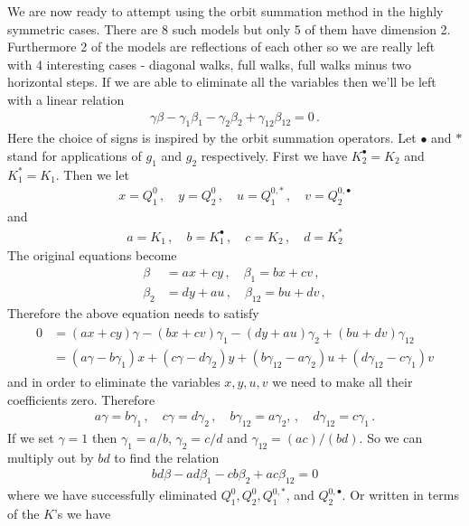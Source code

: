 We are now ready to attempt using the orbit summation method in the highly symmetric cases. There are 8 such models but only 5 of them have dimension 2. Furthermore 2 of the models are reflections of each other so we are really left with 4 interesting cases - diagonal walks, full walks, full walks minus two horizontal steps. If we are able to eliminate all the variables then we'll be left with a linear relation
\begin{align}
	\gamma \beta- \gamma_1 \beta_1-\gamma_2 \beta_2 + \gamma_{12}\beta_{12} = 0\,.
\end{align}
Here the choice of signs is inspired by the orbit summation operators. Let $\bullet$ and $\ast$ stand for applications of $g_1$ and $g_2$ respectively. First we have $K_2^\bullet = K_2$ and $K_1^\ast = K_1$. Then we let
\begin{align}
	x = Q_1^0\,,\quad y= Q_2^0\,, \quad u= Q_1^{0,\ast}\,,\quad v = Q_2^{0,\bullet}
\end{align}
and
\begin{align}
	a = K_1\,,\quad b = K_1^\bullet\,,\quad c=K_2 \,, \quad d = K_2^\ast
\end{align}
The original equations become
\begin{align}
	\beta &= a x + c y\,,\quad \beta_1 = b x + c v\,,\\
	\beta_2 &= d y + a u\,,\quad \beta_{12} = b u + d v\,,
\end{align}
Therefore the above equation needs to satisfy
\begin{align}\begin{split}
	0 &= (ax+cy)\gamma - (bx+cv)\gamma_1 - (dy+au)\gamma_2 + (bu +dv) \gamma_{12}\\
	   &= (a\gamma-b\gamma_1)x + (c\gamma-d\gamma_2)y + (b\gamma_{12}-a\gamma_2)u + (d\gamma_{12}-c\gamma_1)v
\end{split}\end{align}
and in order to eliminate the variables $x,y,u,v$ we need to make all their coefficients zero. Therefore
\begin{align}
	a\gamma = b\gamma_1\,,\quad c\gamma = d\gamma_2\,, \quad b\gamma_{12} = a \gamma_2,\,,\quad d\gamma_{12} = c\gamma_1\,.
\end{align}
If we set $\gamma = 1$ then $\gamma_1 = a/b$, $\gamma_2 = c/d$ and $\gamma_{12} = (ac)/(bd)$. So we can multiply out by $bd$ to find the relation
\begin{align}
	bd\beta-ad\beta_1-cb \beta_2+ac \beta_{12} = 0
\end{align}
where we have successfully eliminated $Q_1^0, Q_2^0, Q_1^{0,\ast}$, and $  Q_2^{0,\bullet}$. Or written in terms of the $K$'s we have
